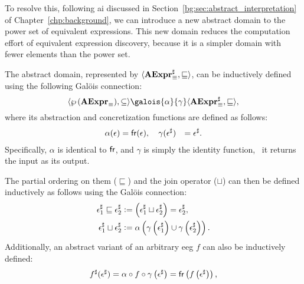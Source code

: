 To resolve this, following \acrlong{ai} discussed in
Section~\ref{bg:sec:abstract_interpretation} of Chapter~\ref{chp:background},
we can introduce a new abstract domain to the power set of equivalent
expressions.  This new domain reduces the computation effort of equivalent
expression discovery, because it is a simpler domain with fewer elements than
the power set.

The abstract domain, represented by $\langle{\ensuremath\mathbf{AExpr}^\sharp_\equiv}, {\sqsubseteq}\rangle$, can
be inductively defined using the following Gal\"ois connection:
\begin{equation}
    \lattice{\eqexprpowerset}{\subseteq}
    \galois{\alpha}{\gamma}
    \lattice{\absexprset}{\sqsubseteq},
\end{equation}
where its abstraction and concretization functions are defined as follows:
\begin{equation}
    \begin{aligned}
        \alpha(\epsilon) &= \operatorname{\mathsf{fr}}(\epsilon), \quad
        \gamma(\epsilon^\sharp) &= \epsilon^\sharp.
    \end{aligned}
\end{equation}
Specifically, $\alpha$ is identical to $\operatorname{\mathsf{fr}}$, and $\gamma$ is simply the
identity function, \ie~it returns the input as its output.

The partial ordering on them ($\sqsubseteq$) and the join operator ($\sqcup$)
can then be defined inductively as follows using the Gal\"ois connection:
\begin{equation}
    \begin{aligned}
        \epsilon^\sharp_1 \sqsubseteq \epsilon^\sharp_2 &\vcentcolon=
            \left( \epsilon^\sharp_1 \sqcup \epsilon^\sharp_2 \right)
            = \epsilon^\sharp_2, \\
        \epsilon^\sharp_1 \sqcup \epsilon^\sharp_2 &\vcentcolon=
            \alpha\left(
                \gamma\left( \epsilon^\sharp_1 \right) \cup
                \gamma\left( \epsilon^\sharp_2 \right)
            \right).
    \end{aligned}
\end{equation}
Additionally, an abstract variant of an arbitrary \gls{eeg} $f$ can also be
inductively defined:
\begin{equation}
    f^\sharp (\epsilon^\sharp)
    = \alpha \circ f \circ \gamma \left(\epsilon^\sharp\right)
    = \operatorname{\mathsf{fr}}\left(f\left(\epsilon^\sharp\right)\right),
\end{equation}

